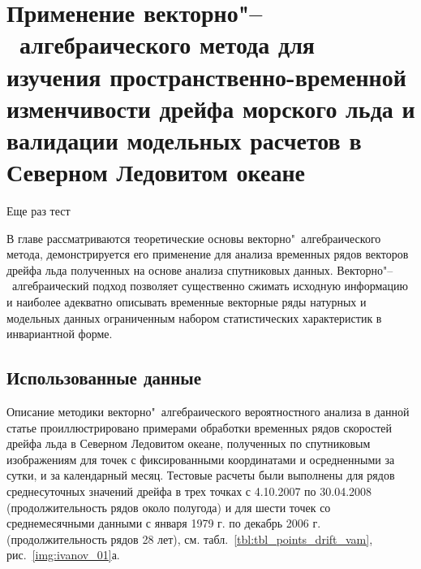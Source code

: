 \chapter{Применение векторно"--~алгебраического метода для изучения пространственно-временной изменчивости дрейфа морского льда и валидации модельных расчетов в Северном Ледовитом океане} \label{chapt3}

Еще раз тест

В главе рассматриваются теоретические основы векторно"~алгебраического метода, демонстрируется его применение для анализа временных рядов векторов дрейфа льда полученных на основе анализа спутниковых данных. Векторно"--~алгебраический подход позволяет существенно сжимать исходную информацию и наиболее адекватно описывать временные векторные ряды натурных и модельных данных ограниченным набором статистических характеристик в инвариантной форме.

\section{Использованные данные} \label{sect3_1}

Описание методики векторно"~алгебраического вероятностного анализа в данной статье проиллюстрировано примерами обработки временных рядов скоростей дрейфа льда в Северном Ледовитом океане, полученных по спутниковым изображениям для точек с фиксированными координатами и осредненными за сутки, и за календарный месяц. Тестовые расчеты были выполнены для рядов среднесуточных значений дрейфа в трех точках с 4.10.2007 по 30.04.2008 (продолжительность рядов около полугода) и для шести точек со среднемесячными данными с января 1979 г. по декабрь 2006 г. (продолжительность рядов 28 лет), см. табл.~\ref{tbl:tbl_points_drift_vam}, рис.~\ref{img:ivanov_01}а.

